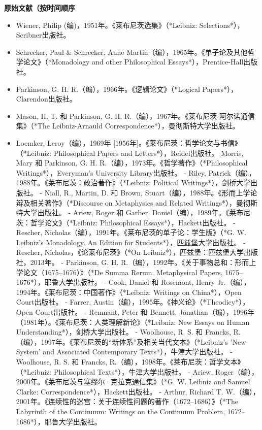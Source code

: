\textbf{原始文献（按时间顺序}
\begin{itemize}
\item Wiener, Philip (编)，1951年。《莱布尼茨选集》（*Leibniz: Selections*），Scribner出版社。
\item Schrecker, Paul & Schrecker, Anne Martin（编），1965年。《单子论及其他哲学论文》（*Monadology and other Philosophical Essays*），Prentice-Hall出版社。
\item Parkinson, G. H. R.（编），1966年。《逻辑论文》（*Logical Papers*），Clarendon出版社。
\item Mason, H. T. 和 Parkinson, G. H. R.（编），1967年。《莱布尼茨-阿尔诺通信集》（*The Leibniz-Arnauld Correspondence*），曼彻斯特大学出版社。
\item Loemker, Leroy（编），1969年 [1956年]。《莱布尼茨：哲学论文与书信》（*Leibniz: Philosophical Papers and Letters*），Reidel出版社。
Morris, Mary 和 Parkinson, G. H. R.（编），1973年。《哲学著作》（*Philosophical Writings*），Everyman's University Library出版社。
- Riley, Patrick（编），1988年。《莱布尼茨：政治著作》（*Leibniz: Political Writings*），剑桥大学出版社。
- Niall, R., Martin, D. 和 Brown, Stuart（编），1988年。《形而上学论辩及相关著作》（*Discourse on Metaphysics and Related Writings*），曼彻斯特大学出版社。
- Ariew, Roger 和 Garber, Daniel（编），1989年。《莱布尼茨：哲学论文》（*Leibniz: Philosophical Essays*），Hackett出版社。
- Rescher, Nicholas（编），1991年。《莱布尼茨的单子论：学生版》（*G. W. Leibniz's Monadology. An Edition for Students*），匹兹堡大学出版社。
- Rescher, Nicholas，《论莱布尼茨》（*On Leibniz*），匹兹堡：匹兹堡大学出版社，2013年。
- Parkinson, G. H. R.（编），1992年。《关于事物总和：形而上学论文（1675–1676）》（*De Summa Rerum. Metaphysical Papers, 1675–1676*），耶鲁大学出版社。
- Cook, Daniel 和 Rosemont, Henry Jr.（编），1994年。《莱布尼茨：中国著作》（*Leibniz: Writings on China*），Open Court出版社。
- Farrer, Austin（编），1995年。《神义论》（*Theodicy*），Open Court出版社。
- Remnant, Peter 和 Bennett, Jonathan（编），1996年（1981年）。《莱布尼茨：人类理解新论》（*Leibniz: New Essays on Human Understanding*），剑桥大学出版社。
- Woolhouse, R. S. 和 Francks, R.（编），1997年。《莱布尼茨的“新体系”及相关当代文本》（*Leibniz's 'New System' and Associated Contemporary Texts*），牛津大学出版社。
- Woolhouse, R. S. 和 Francks, R.（编），1998年。《莱布尼茨：哲学文本》（*Leibniz: Philosophical Texts*），牛津大学出版社。
- Ariew, Roger（编），2000年。《莱布尼茨与塞缪尔·克拉克通信集》（*G. W. Leibniz and Samuel Clarke: Correspondence*），Hackett出版社。
- Arthur, Richard T. W.（编），2001年。《连续性的迷宫：关于连续性问题的著作（1672–1686）》（*The Labyrinth of the Continuum: Writings on the Continuum Problem, 1672–1686*），耶鲁大学出版社。

\end{itemize}
